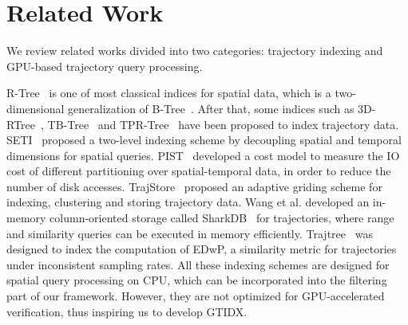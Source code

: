 \documentclass[10pt,conference,letterpaper]{IEEEtran}
\newcommand{\frname}{GAT\xspace }
\newcommand{\idxname}{GTIDX\xspace }
\begin{document}
\section{Related Work}\label{sec:related}

We review related works divided into two categories: trajectory indexing and GPU-based trajectory query processing.

\vspace{0.1cm}{\bf Trajectory indexing.}
%
R-Tree~\cite{DBLP:conf/sigmod/Guttman84} is one of most classical indices for spatial data, which is a two-dimensional generalization of B-Tree~\cite{DBLP:conf/sigmod/BayerM70}.
After that, some indices such as 3D-RTree~\cite{DBLP:conf/icmcs/TheodoridisVS96}, TB-Tree~\cite{DBLP:conf/vldb/PfoserJT00} and TPR-Tree~\cite{DBLP:conf/sigmod/SaltenisJLL00} have been proposed to index trajectory data.
SETI~\cite{DBLP:conf/cidr/ChakkaEP03} proposed a two-level indexing scheme by decoupling spatial and temporal dimensions for spatial queries.
PIST~\cite{DBLP:journals/geoinformatica/BoteaMNS08} developed a cost model to measure the IO cost of different partitioning over spatial-temporal data, in order to reduce the number of disk accesses.
TrajStore~\cite{DBLP:conf/icde/Cudre-MaurouxWM10} proposed an adaptive griding scheme for indexing, clustering and storing trajectory data.
Wang et al. developed an in-memory column-oriented storage called SharkDB~\cite{DBLP:conf/cikm/WangZXZZS14} for trajectories, where range and similarity queries can be executed in memory efficiently.
Trajtree~\cite{EDWP15} was designed to index the computation of EDwP, a similarity metric for trajectories under inconsistent sampling rates.
All these indexing schemes are designed for spatial query processing on CPU, which can be incorporated into the filtering part of our framework. However, they are not optimized for GPU-accelerated verification, thus inspiring us to develop \idxname.
\end{document}
